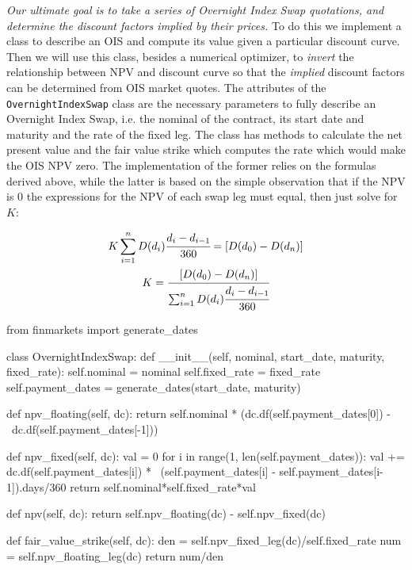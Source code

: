 \begin{finmarkets}
\emph{Our ultimate goal is to take a series of Overnight Index Swap quotations, and determine the discount factors implied by their prices.} To do this we implement a class to describe an OIS and compute its value given a particular discount curve. Then we will use this class, besides a numerical optimizer, to \emph{invert} the relationship between NPV and discount curve so that the \emph{implied} discount factors can be determined from OIS market quotes.
The attributes of the \texttt{OvernightIndexSwap} class are the necessary parameters to fully describe an Overnight Index Swap, i.e. the nominal of the contract, its start date and maturity and the rate of the fixed leg. The class has methods to calculate the net present value and the fair value strike which computes the rate which would make the OIS NPV zero. The implementation of the former relies on the formulas derived above, while the latter is based on the simple observation that if the NPV is 0 the expressions for the NPV of each swap leg must equal, then just solve for $K$:

\begin{equation}
\begin{gathered}
K \sum_{i=1}^{n}D(d_{i})\cfrac{d_i - d_{i-1}}{360} = [D(d_0) - D(d_n)] \\
K = \cfrac{[D(d_0) - D(d_n)]}{\sum_{i=1}^{n}D(d_{i})\cfrac{d_i - d_{i-1}}{360}}
\end{gathered}
\end{equation}
\end{finmarkets}

\begin{ipython}
from finmarkets import generate_dates

class OvernightIndexSwap:
    def __init__(self, nominal, start_date, maturity, fixed_rate):
        self.nominal = nominal
        self.fixed_rate = fixed_rate
        self.payment_dates = generate_dates(start_date, maturity)
      
    def npv_floating(self, dc):
        return self.nominal * (dc.df(self.payment_dates[0]) - \
                               dc.df(self.payment_dates[-1]))
  
    def npv_fixed(self, dc):
        val = 0
        for i in range(1, len(self.payment_dates)):
            val += dc.df(self.payment_dates[i]) * \
                    (self.payment_dates[i] - self.payment_dates[i-1]).days/360 
        return self.nominal*self.fixed_rate*val
  
    def npv(self, dc):
        return self.npv_floating(dc) - self.npv_fixed(dc)

    def fair_value_strike(self, dc):
        den = self.npv_fixed_leg(dc)/self.fixed_rate
        num = self.npv_floating_leg(dc)
        return num/den
\end{ipython}

